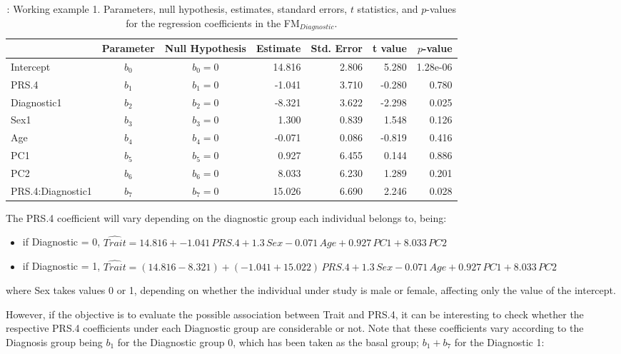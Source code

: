 \documentclass[
]{article}
\providecommand{\tightlist}{%
  \setlength{\itemsep}{0pt}\setlength{\parskip}{0pt}}
\begin{document}
\begin{table}[h!]
\centering
\begin{tabular}{l|ccrrrr}
\hline
              &  Parameter & Null Hypothesis & Estimate & Std. Error & t value & $p$-value\\
\hline
Intercept & $b_0$ &  $b_0=0$ & 14.816 & 2.806 &  5.280 & 1.28e-06\\
PRS.4 & $b_1$ &  $b_1=0$ & -1.041 & 3.710 & -0.280 &  0.780\\
Diagnostic1 & $b_2$ &  $b_2=0$ & -8.321 & 3.622 & -2.298 &  0.025\\
Sex1 & $b_3$ &  $b_3=0$ & 1.300 & 0.839 &  1.548 &  0.126\\
Age & $b_4$ &  $b_4=0$ & -0.071 & 0.086 & -0.819 &  0.416\\
PC1 & $b_5$ &  $b_5=0$ & 0.927 & 6.455 &  0.144 &  0.886\\ 
PC2 & $b_6$ &  $b_6=0$ & 8.033 & 6.230 &  1.289 &  0.201\\
PRS.4:Diagnostic1 & $b_7$ &  $b_7=0$ & 15.026 & 6.690 &  2.246 &  0.028\\
 \hline
\end{tabular}
\caption{\label{tab:Table2}: Working example 1. Parameters, null hypothesis, estimates, standard errors, $t$ statistics, and $p$-values for the regression coefficients in the FM$_{Diagnostic}$.}
\end{table}

\bigskip

The PRS.4 coefficient will vary depending on the diagnostic group each
individual belongs to, being:

\begin{itemize}
\tightlist
\item
  if Diagnostic = 0,
  \(\widehat{Trait} = 14.816 + -1.041\, PRS.4 + 1.3\,Sex -0.071\,Age + 0.927\,PC1 + 8.033\,PC2\)
\item
  if Diagnostic = 1,
  \(\widehat{Trait} = (14.816 -8.321) + (-1.041+15.022)\,PRS.4 + 1.3\,Sex -0.071\,Age + 0.927\,PC1 + 8.033\,PC2\)
\end{itemize}

where Sex takes values 0 or 1, depending on whether the individual under
study is male or female, affecting only the value of the intercept.

However, if the objective is to evaluate the possible association
between Trait and PRS.4, it can be interesting to check whether the
respective PRS.4 coefficients under each Diagnostic group are
considerable or not. Note that these coefficients vary according to the
Diagnosis group being \(b_1\) for the Diagnostic group 0, which has been
taken as the basal group; \(b_1 + b_7\) for the Diagnostic 1:
\end{document}
